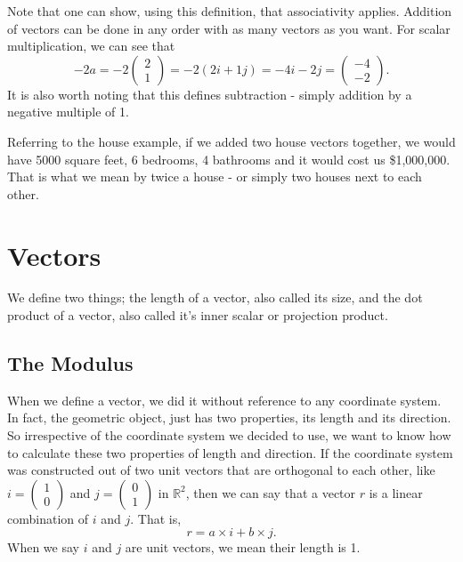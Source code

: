 \documentclass[
]{book}
\theoremstyle{definition}
\theoremstyle{definition}
\theoremstyle{definition}
\theoremstyle{definition}
\theoremstyle{remark}
\begin{document}
Note that one can show, using this definition, that associativity applies. Addition of vectors can be done in any order with as many vectors as you want. For scalar multiplication, we can see that \[ -2a = -2 \begin{pmatrix} 2\\1 \end{pmatrix} = -2(2i+1j) = -4i-2j = \begin{pmatrix} -4\\-2 \end{pmatrix}.\] It is also worth noting that this defines subtraction - simply addition by a negative multiple of 1.

Referring to the house example, if we added two house vectors together, we would have 5000 square feet, 6 bedrooms, 4 bathrooms and it would cost us \$1,000,000. That is what we mean by twice a house - or simply two houses next to each other.

\hypertarget{vectors}{%
\section{Vectors}\label{vectors}}

We define two things; the length of a vector, also called its size, and the dot product of a vector, also called it's inner scalar or projection product.

\hypertarget{the-modulus}{%
\subsection{The Modulus}\label{the-modulus}}

When we define a vector, we did it without reference to any coordinate system. In fact, the geometric object, just has two properties, its length and its direction. So irrespective of the coordinate system we decided to use, we want to know how to calculate these two properties of length and direction. If the coordinate system was constructed out of two unit vectors that are orthogonal to each other, like \(i = \begin{pmatrix}1 \\ 0 \end{pmatrix}\) and \(j = \begin{pmatrix}0 \\ 1 \end{pmatrix}\) in \(\mathbb{R}^2\), then we can say that a vector \(r\) is a linear combination of \(i\) and \(j\). That is, \[r =a \times i + b \times j.\] When we say \(i\) and \(j\) are unit vectors, we mean their length is 1.
\end{document}
